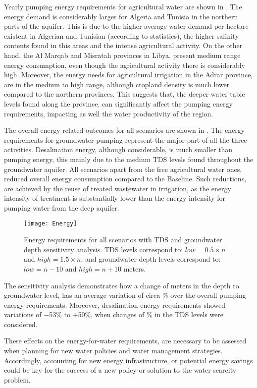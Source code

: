 Yearly pumping energy requirements for agricultural water are shown in . The energy demand is considerably larger for Algeria and Tunisia in the northern parts of the aquifer. This is due to the higher average water demand per hectare existent in Algerian and Tunisian (according to statistics), the higher salinity contents found in this areas and the intense agricultural activity. On the other hand, the Al Marqab and Misratah provinces in Libya, present medium range energy consumption, even though the agricultural activity there is considerably high. Moreover, the energy needs for agricultural irrigation in the Adrar province, are in the medium to high range, although cropland density is much lower compared to the northern provinces. This suggests that, the deeper water table levels found along the province, can significantly affect the pumping energy requirements, impacting as well the water productivity of the region.

The overall energy related outcomes for all scenarios are shown in . The energy requirements for groundwater pumping represent the major part of all the three activities. Desalination energy, although considerable, is much smaller than pumping energy, this mainly due to the medium TDS levels found throughout the groundwater aquifer. All scenarios apart from the free agricultural water ones, reduced overall energy consumption compared to the Baseline. Such reductions, are achieved by the reuse of treated wastewater in irrigation, as the energy intensity of treatment is substantially lower than the energy intensity for pumping water from the deep aquifer.

\begin{figure}[!ht]
\texttt{[image: Energy]}
\caption{Energy requirements for all scenarios with TDS and groundwater depth sensitivity analysis. TDS levels correspond to: $low=0.5\times n$ and $high=1.5\times n$; and groundwater depth levels correspond to: $low=n-10$ and $high=n+10$ meters.}
\label{fig:energy}
\end{figure}

The sensitivity analysis demonstrates how a change of  meters in the depth to groundwater level, has an average variation of circa \% over the overall pumping energy requirements. Moreover, desalination energy requirements showed variations of $-$53\% to $+$50\%, when changes of \% in the TDS levels were considered.

These effects on the energy-for-water requirements, are necessary to be assessed when planning for new water policies and water management strategies. Accordingly, accounting for new energy infrastructure, or potential energy savings could be key for the success of a new policy or solution to the water scarcity problem.